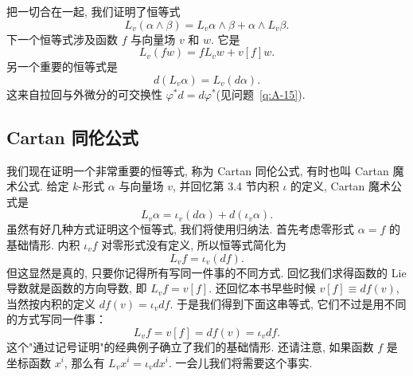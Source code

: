把一切合在一起, 我们证明了恒等式
\[
L_v(\alpha\wedge\beta)=L_v\alpha\wedge\beta+\alpha\wedge L_v\beta.
\]
下一个恒等式涉及函数 $f$ 与向量场 $v$ 和 $w$. 它是
\[
L_v(fw)=fL_vw+v[f]w.
\]
另一个重要的恒等式是
\[
d\left(L_v\alpha\right)=L_v\left(d\alpha\right).
\]
这来自拉回与外微分的可交换性 $\varphi^*d=d\varphi^*$(见问题~\ref{q:A-15}).

\subsection{Cartan 同伦公式}

我们现在证明一个非常重要的恒等式, 称为 Cartan 同伦公式, 有时也叫 Cartan 魔术公式. 给定 $k$-形式 $\alpha$ 与向量场 $v$, 并回忆第 3.4 节内积 $\iota$ 的定义, Cartan 魔术公式是
\[
L_v\alpha=\iota_v(d\alpha)+d(\iota_v\alpha).
\]
虽然有好几种方式证明这个恒等式, 我们将使用归纳法. 首先考虑零形式 $\alpha=f$ 的基础情形. 内积 $\iota_vf$ 对零形式没有定义, 所以恒等式简化为
\[
L_vf=\iota_v(df).
\]
但这显然是真的, 只要你记得所有写同一件事的不同方式. 回忆我们求得函数的 Lie 导数就是函数的方向导数, 即 $L_vf=v[f]$. 还回忆本书早些时候 $v[f]\equiv df(v)$, 当然按内积的定义 $df(v)=\iota_vdf$. 于是我们得到下面这串等式, 它们不过是用不同的方式写同一件事：
\[
L_vf=v[f]=df(v)=\iota_vdf.
\]
这个"通过记号证明"的经典例子确立了我们的基础情形. 还请注意, 如果函数 $f$ 是坐标函数 $x^i$, 那么有 $L_vx^i=\iota_vdx^i$. 一会儿我们将需要这个事实.

